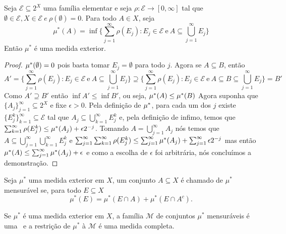 \begin{proposicao} \label{prop2.1}
    Seja $\mathcal{E} \subseteq 2^X$ uma família elementar e seja $\rho: \mathcal{E} \longrightarrow [0,\infty]$ tal que $\emptyset \in \mathcal{E}, X \in \mathcal{E} \ e \ \rho(\emptyset)=0$. Para todo $A \in X$, seja 
    \[
    \mu^*(A)= \inf \bigg\{  \sum _{j=1} ^\infty \rho(E_j): E_j \in \mathcal{E} \ \text{e} \ A \subseteq \bigcup_{j=1} ^\infty E_j \bigg\}  
    \]
    Então $\mu^*$ é uma medida exterior.
    
    \begin{proof}
        $\mu^*(\emptyset)=0$ pois basta tomar $E_j=\emptyset$ para todo $j$. Agora se $A \subseteq B$, então 
        \[
            A'=\bigg\{  \sum _{j=1} ^\infty \rho(E_j): E_j \in \mathcal{E} \ \text{e} \ A \subseteq \bigcup_{j=1} ^\infty E_j \bigg\} \supseteq \bigg\{  \sum _{j=1} ^\infty \rho(E_j): E_j \in \mathcal{E} \ \text{e} \ A \subseteq B \subseteq \bigcup_{j=1} ^\infty E_j \bigg\} = B'
        \]
        Como $A' \supseteq B'$ então $\inf A' \leq \inf B'$, ou seja, $\mu^*(A) \leq \mu^*(B)$
        Agora suponha que $\{ A_j \}_{j=1}^\infty \subseteq 2^X$ e fixe $\epsilon>0$. Pela definição de $\mu^*$, para cada um dos $j$ existe $\{ E_j ^k \}_{k=1} ^\infty \subseteq \mathcal{E}$ tal que $A_j \subseteq \bigcup _{k=1}^\infty E_j ^k$ e, pela definição de infimo, temos que $\sum _{k=1}^\infty \rho (E_j ^k) \leq \mu^*(A_j) + \epsilon 2^{-j }$. Tomando $A=\bigcup _{j=1}^\infty A_j$ nós temos que $A \subseteq \bigcup _{j=1}^\infty \bigcup _{k=1}^\infty E_j ^k$ e $\sum _{j=1}^\infty \sum _{k=1}^\infty \rho (E_j ^k) \leq \sum _{j=1}^\infty \mu^*(A_j) + \sum _{j=1}^\infty \epsilon 2^{-j }$ mas então $\mu^*(A) \leq \sum _{j=1}^\infty \mu^*(A_j) + \epsilon$ e como a escolha de $\epsilon$ foi arbitrária, nós concluímos a demonstração.
    \end{proof}

\end{proposicao}

\begin{definicao}
    Seja $\mu^*$ uma medida exterior em $X$, um conjunto $A \subseteq X$ é chamado de $\mu^*$ mensurável se, para todo $E \subseteq X$ 
    \[
        \mu^*(E)=\mu^*(E \cap A) + \mu^*(E \cap A^c). 
    \]
\end{definicao}

\begin{teorema}
    Se $\mu^*$ é uma medida exterior em $X$, a família $\mathcal{M}$ de conjuntos $\mu^*$ mensuráveis é uma \sig \ e a restrição de $\mu^*$ à $\mathcal{M}$ é uma medida completa.
\end{teorema}

